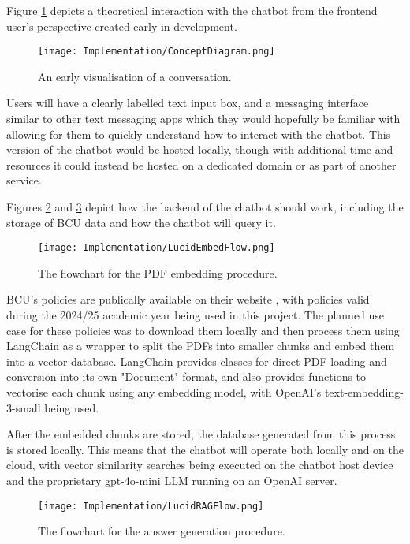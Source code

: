 Figure \ref{fig:ConceptDiagram} depicts a theoretical interaction with the chatbot from the frontend user's perspective created 
early in development.

\begin{figure}[H]
    \centering
    \texttt{[image: Implementation/ConceptDiagram.png]}
    \caption{An early visualisation of a conversation.\label{fig:ConceptDiagram}}
\end{figure}

\noindent Users will have a clearly labelled text input box, and a messaging interface similar to other text messaging apps 
which they would hopefully be familiar with allowing for them to quickly understand how to interact with the chatbot.
This version of the chatbot would be hosted locally, though with additional time and resources it could instead be hosted on a 
dedicated domain or as part of another service.

\para Figures \ref{fig:EmbedFlowchart} and \ref{fig:RAGFlowchart} depict how the backend of the chatbot should work, including the 
storage of BCU data and how the chatbot will query it.

\begin{figure}[H]
    \centering
    \texttt{[image: Implementation/LucidEmbedFlow.png]}
    \caption{The flowchart for the PDF embedding procedure.\label{fig:EmbedFlowchart}}
\end{figure}

\noindent BCU's policies are publically available on their website \autocite{bcuPoliciesProcedures}, with policies valid during the 2024/25 academic
year being used in this project. The planned use case for these policies was to download them locally and then process them using LangChain as a 
wrapper to split the PDFs into smaller chunks and embed them into a vector database. LangChain provides classes for direct PDF loading and 
conversion into its own "Document" format, and also provides functions to vectorise each chunk using any embedding model, with OpenAI's 
text-embedding-3-small being used. 

\para After the embedded chunks are stored, the database generated from this process is stored locally. This means that the chatbot will operate 
both locally and on the cloud, with vector similarity searches being executed on the chatbot host device and the proprietary gpt-4o-mini LLM running 
on an OpenAI server.

\begin{figure}[H]
    \centering
    \texttt{[image: Implementation/LucidRAGFlow.png]}
    \caption{The flowchart for the answer generation procedure.\label{fig:RAGFlowchart}}
\end{figure}

